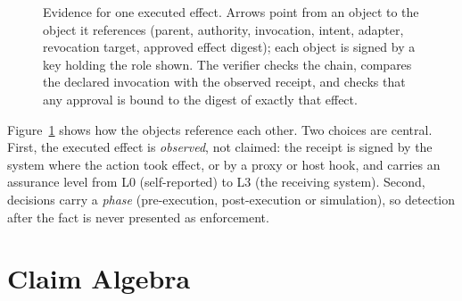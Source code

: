 \documentclass[conference]{IEEEtran}
\begin{document}
\begin{figure}[t]
\centering
{}
\caption{Evidence for one executed effect. Arrows point from an object to the object it references (parent, authority, invocation, intent, adapter, revocation target, approved effect digest); each object is signed by a key holding the role shown. The verifier checks the chain, compares the declared invocation with the observed receipt, and checks that any approval is bound to the digest of exactly that effect.}\label{fig:chain}
\end{figure}

Figure~\ref{fig:chain} shows how the objects reference each other. Two choices are central. First, the executed effect is \emph{observed}, not claimed: the receipt is signed by the system where the action took effect, or by a proxy or host hook, and carries an assurance level from L0 (self-reported) to L3 (the receiving system). Second, decisions carry a \emph{phase} (pre-execution, post-execution or simulation), so detection after the fact is never presented as enforcement.

\section{Claim Algebra}\label{sec:algebra}
\end{document}
